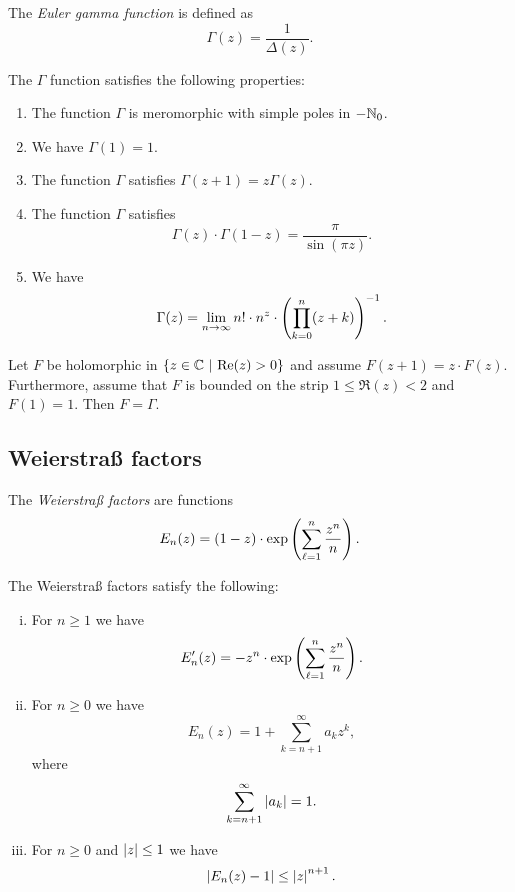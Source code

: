 \begin{definicija}
The \emph{Euler gamma function} is
defined as
\[
\Gamma(z) = \frac{1}{\Delta(z)}.
\]
\end{definicija}

\begin{izrek}
The $\Gamma$ function satisfies the following properties:

\begin{enumerate}
\item The function $\Gamma$ is meromorphic with simple poles in
$-\mathbb{N}_0$.
\item We have $\Gamma(1) = 1$.
\item The function $\Gamma$ satisfies $\Gamma(z+1) = z \Gamma(z)$.
\item The function $\Gamma$ satisfies
\[
\Gamma(z) \cdot \Gamma(1-z) = \frac{\pi}{\sin(\pi z)}.
\]
\item We have
\[
\Gamma(z) =
\lim_{n \to \infty}
n! \cdot n^z \cdot \left(\prod_{k=0}^n (z+k)\right)^{-1}.
\]
\end{enumerate}
\end{izrek}

\obvs

\begin{izrek}
Let $F$ be holomorphic in $\left\{z \in \mathbb{C}~\middle\vert~\operatorname{Re}(z) > 0\right\}$ and assume
$F(z+1) = z \cdot F(z)$. Furthermore, assume that $F$ is bounded
on the strip $1 \leq \Re(z) < 2$ and $F(1) = 1$. Then $F = \Gamma$.
\end{izrek}

\newpage

\subsection{Weierstraß factors}


\begin{definicija}
The \emph{Weierstraß factors} are
functions
\[
E_n(z) = (1-z) \cdot \exp \left(\sum_{\ell=1}^n \frac{z^n}{n}\right).
\]
\end{definicija}

\begin{lema}
The Weierstraß factors satisfy the following:

\begin{enumerate}[i)]
\item For $n \geq 1$ we have
\[
E_n'(z) = -z^n \cdot \exp \left(\sum_{\ell=1}^n \frac{z^n}{n}\right).
\]
\item For $n \geq 0$ we have
\[
E_n(z) = 1 + \sum_{k=n+1}^\infty a_k z^k,
\]
where
\[
\sum_{k=n+1}^\infty \left\lvert a_k\right\rvert = 1.
\]
\item For $n \geq 0$ and $\left\lvert z\right\rvert \leq 1$ we have
\[
\left\lvert E_n(z) - 1\right\rvert \leq \left\lvert z\right\rvert^{n+1}.
\]
\end{enumerate}
\end{lema}

